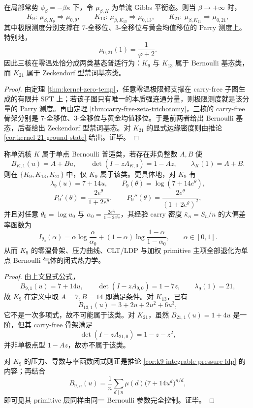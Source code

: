 \begin{theorem}[零温基态的两类普适行为]\label{thm:kernel-ground-state-universality-classes}
在局部常势 \(\phi_\beta=-\beta\kappa\) 下，令 \(\mu_{\beta,K}\) 为单流 Gibbs 平衡态。则当 \(\beta\to+\infty\) 时，
\[
K_9:\ \mu_{\beta,K_9}\Longrightarrow \mu_{0,9},
\qquad
K_{13}:\ \mu_{\beta,K_{13}}\Longrightarrow \mu_{0,13},
\qquad
K_{21}:\ \mu_{\beta,K_{21}}\Longrightarrow \mu_{0,21},
\]
其中极限测度分别支撑在 \(7\)-全移位、\(3\)-全移位与黄金均值移位的 Parry 测度上。特别地，
\[
\mu_{0,21}(1)=\frac{1}{\varphi+2}.
\]
因此三核在零温处恰分成两类基态普适行为：\(K_9\) 与 \(K_{13}\) 属于 Bernoulli 基态类，而 \(K_{21}\) 属于 Zeckendorf 型禁词基态类。
\end{theorem}
\begin{proof}
由定理 \ref{thm:kernel-zero-temp}，任意零温极限都支撑在 carry-free 子图生成的有限并 SFT 上；若该子图只有唯一的本质强连通分量，则极限测度就是该分量的 Parry 测度。再由定理 \ref{thm:carry-free-zeta-trichotomy}，三核的 carry-free 骨架分别是 \(7\)-全移位、\(3\)-全移位与黄金均值移位。于是前两者给出 Bernoulli 基态，后者给出 Zeckendorf 型禁词基态。对 \(K_{21}\) 的显式边缘密度则由推论 \ref{cor:kernel-21-ground-state} 给出。证毕。
\end{proof}

\begin{theorem}\label{thm:kernel-one-site-bernoulli-class}
称单流核 \(K\) 属于单点 Bernoulli 普适类，若存在非负整数 \(A,B\) 使
\[
B_{K,1}(u)=A+Bu,\qquad
\det(I-zA_{K,0})=1-Az,\qquad
\lambda_K(1)=A+B.
\]
则在 \(\{K_9,K_{13},K_{21}\}\) 中，仅 \(K_9\) 属于该类。更具体地，对 \(K_9\) 有
\[
\lambda_9(u)=7+14u,\qquad
P_9(\theta)=\log(7+14e^\theta),
\]
\[
P_9'(\theta)=\frac{2e^\theta}{1+2e^\theta},
\qquad
P_9''(\theta)=\frac{2e^\theta}{(1+2e^\theta)^2},
\]
并且对任意 \(\theta_0=\log u_0\) 与
\(
\alpha_0=\frac{2e^{\theta_0}}{1+2e^{\theta_0}}
\)，其经验 carry 密度 \(\bar\kappa_n=S_n/n\) 的大偏差率函数为
\[
I_{\theta_0}(\alpha)
=\alpha\log\frac{\alpha}{\alpha_0}
+(1-\alpha)\log\frac{1-\alpha}{1-\alpha_0},
\qquad \alpha\in[0,1].
\]
从而 \(K_9\) 的零温骨架、压力曲线、CLT/LDP 与加权 primitive 主项全部退化为单点 Bernoulli 气体的闭式热力学。
\end{theorem}
\begin{proof}
由上文显式公式，
\[
B_{9,1}(u)=7+14u,\qquad
\det(I-zA_{9,0})=1-7z,\qquad
\lambda_9(1)=21,
\]
故 \(K_9\) 在定义中取 \(A=7,B=14\) 即满足条件。对 \(K_{13}\)，已有
\[
B_{13,1}(u)=3+2u+2u^2+6u^3,
\]
它不是一次多项式，故不可能属于该类。对 \(K_{21}\)，虽然
\(
B_{21,1}(u)=1+4u
\)
是一阶，但其 carry-free 骨架满足
\[
\det(I-zA_{21,0})=1-z-z^2,
\]
并非单极点型 \(1-Az\)，故亦不属于该类。

对 \(K_9\) 的压力、导数与率函数闭式则正是推论 \ref{cor:k9-integrable-pressure-ldp} 的内容；再结合
\[
B_{9,n}(u)=\frac{1}{n}\sum_{d\mid n}\mu(d)\bigl(7+14u^d\bigr)^{n/d},
\]
即可见其 primitive 层同样由同一 Bernoulli 参数完全控制。证毕。
\end{proof}

